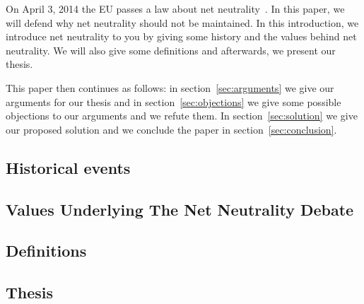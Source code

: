 
On April 3, 2014 the EU passes a law about net neutrality~\cite{whittaker2014eu}. In this paper, we will defend why net neutrality should not be maintained. In this introduction, we introduce net neutrality to you by giving some history and the values behind net neutrality. We will also give some definitions and afterwards, we present our thesis.

This paper then continues as follows: in section~\ref{sec:arguments} we give our arguments for our thesis and in section~\ref{sec:objections} we give some possible objections to our arguments and we refute them. In section~\ref{sec:solution} we give our proposed solution and we conclude the paper in section~\ref{sec:conclusion}.

\subsection{Historical events}
\label{sec:intro_problem}


\subsection{Values Underlying The Net Neutrality Debate}
\label{sec:values}


\subsection{Definitions}
\label{sec:intro_def}


\subsection{Thesis}
\label{sec:intro_thesis}
